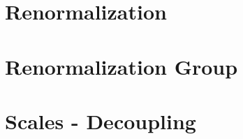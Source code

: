 \documentclass[11pt]{report}
\begin{document}
\chapter{Renormalization}
\label{cha:renormalization}



\chapter{Renormalization Group}
\label{cha:renorm-group}

\chapter{Scales - Decoupling}
\label{cha:scales-decoupling}

\printindex
\end{document}

